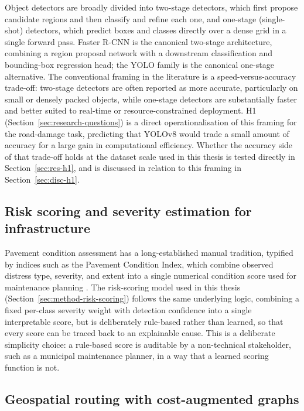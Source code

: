 \documentclass[10pt,a4paper,twocolumn]{article}
\begin{document}
Object detectors are broadly divided into two-stage detectors, which
first propose candidate regions and then classify and refine each one,
and one-stage (single-shot) detectors, which predict boxes and classes
directly over a dense grid in a single forward pass. Faster R-CNN
\citep{ren2015fasterrcnn} is the canonical two-stage architecture,
combining a region proposal network with a downstream classification and
bounding-box regression head; the YOLO family
\citep{redmon2016yolo,jocher2023ultralytics} is the canonical one-stage
alternative. The conventional framing in the literature is a speed-versus-accuracy
trade-off: two-stage detectors are often reported as more accurate,
particularly on small or densely packed objects, while one-stage
detectors are substantially faster and better suited to real-time or
resource-constrained deployment. H1 (Section~\ref{sec:research-questions})
is a direct operationalisation of this framing for the road-damage task,
predicting that YOLOv8 would trade a small amount of accuracy for a large
gain in computational efficiency. Whether the accuracy side of that
trade-off holds at the dataset scale used in this thesis is tested
directly in Section~\ref{sec:res-h1}, and is discussed in relation to
this framing in Section~\ref{sec:disc-h1}.

\subsection{Risk scoring and severity estimation for infrastructure}
\label{sec:rw-risk-scoring}

Pavement condition assessment has a long-established manual tradition,
typified by indices such as the Pavement Condition Index, which combine
observed distress type, severity, and extent into a single numerical
condition score used for maintenance planning \citep{shahin2005pci}.
The risk-scoring model used in
this thesis (Section~\ref{sec:method-risk-scoring}) follows the same
underlying logic, combining a fixed per-class severity weight with
detection confidence into a single interpretable score, but is
deliberately rule-based rather than learned, so that every score can be
traced back to an explainable cause. This is a deliberate simplicity
choice: a rule-based score is auditable by a non-technical stakeholder,
such as a municipal maintenance planner, in a way that a learned scoring
function is not.

\subsection{Geospatial routing with cost-augmented graphs}
\label{sec:rw-routing}
\end{document}
